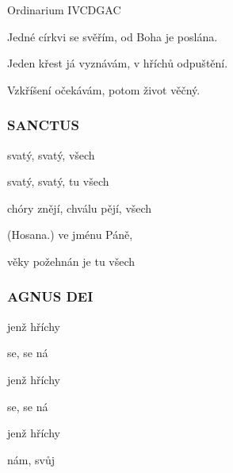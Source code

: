 \begin{song}{Ordinarium IV}{CDGAC}{}
\begin{SBVerse}
Jedné církvi se svěřím, od Boha je poslána.
\end{SBVerse}
\begin{SBVerse}
Jeden křest já vyznávám, v hříchů odpuštění.

Vzkříšení očekávám, potom život věčný.
\end{SBVerse}
\subsubsection*{SANCTUS}
\begin{SBChorus*}
 svatý,  svatý,  všech 

 svatý,  svatý, tu všech 

 chóry znějí,  chválu pějí, všech 

(Hosana.)  ve jménu Páně,

 věky požehnán je tu všech 
\end{SBChorus*}
\subsubsection*{AGNUS DEI}
\begin{SBChorus*}
  jenž  hříchy 

 se,  se  ná

  jenž  hříchy 

 se,  se  ná 

  jenž  hříchy 

 nám,  svůj 
\end{SBChorus*}
\end{song}


